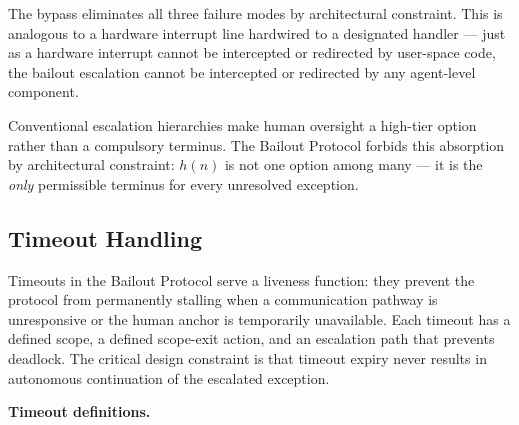 The bypass eliminates all three failure modes by architectural constraint. This is analogous to a hardware interrupt line hardwired to a designated handler --- just as a hardware interrupt cannot be intercepted or redirected by user-space code, the bailout escalation cannot be intercepted or redirected by any agent-level component.

Conventional escalation hierarchies make human oversight a high-tier option rather than a compulsory terminus. The Bailout Protocol forbids this absorption by architectural constraint: $h(n)$ is not one option among many --- it is the \emph{only} permissible terminus for every unresolved exception.

\subsection{Timeout Handling}
\label{sec:bailout-timeouts}

Timeouts in the Bailout Protocol serve a liveness function: they prevent the protocol from permanently stalling when a communication pathway is unresponsive or the human anchor is temporarily unavailable. Each timeout has a defined scope, a defined scope-exit action, and an escalation path that prevents deadlock. The critical design constraint is that timeout expiry never results in autonomous continuation of the escalated exception.

\bigskip
\noindent\textbf{Timeout definitions.}

